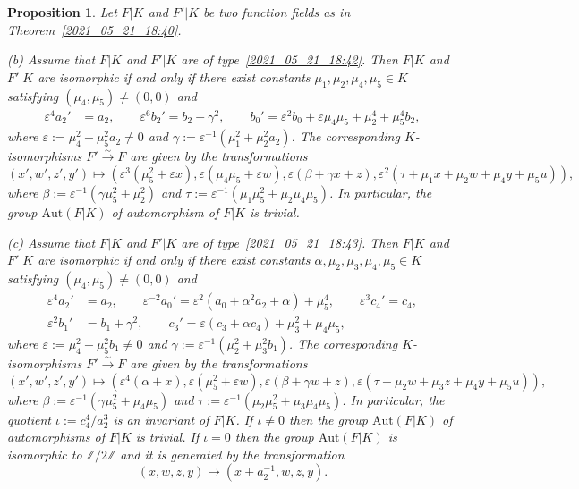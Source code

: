 \documentclass[12pt,reqno]{amsart}
\newtheorem{prop}[thm]{Proposition}
\theoremstyle{definition}
\newcommand{\Z}{\mathbb{Z}}
\newcommand{\al}{\alpha}
\newcommand{\be}{\beta}
\newcommand{\ga}{\gamma}
\newcommand{\eps}{\varepsilon}
\begin{document}
\begin{prop}\label{2024_05_10_01:40}
    Let $F|K$ and $F'|K$ be two function fields as in Theorem~\ref{2021_05_21_18:40}.
    
    \textnormal{(b)}
    Assume that $F|K$ and $F'|K$ are of type~\ref{2021_05_21_18:42}.
    Then $F|K$ and $F'|K$ are isomorphic if and only if there exist constants $\mu_1,\mu_2,\mu_4,\mu_5 \in K$ satisfying $(\mu_4,\mu_5) \neq (0,0)$ and
    \begin{align*}
        \eps^4 a_2' &= a_2, \qquad
        \eps^6 b_2' = b_2 + \ga^2, \qquad
        b_0' = \eps^2 b_0 + \eps \mu_4 \mu_5 + \mu_2^4 + \mu_5^4 b_2,
    \end{align*}
    where $\eps := \mu_4^2 + \mu_5^2 a_2 \neq 0$ and $\ga := \eps^{-1} (\mu_1^2 + \mu_2^2 a_2)$.    
    The corresponding $K$-isomorphisms $F'\overset\sim\to F$ are given by the transformations
    \[ (x',w',z',y') \mapsto ( \eps^3 (\mu_5^2 + \eps x), \eps(\mu_4 \mu_5 + \eps w), \eps (\be + \ga x + z), \eps^2 (\tau + \mu_1 x + \mu_2 w + \mu_4 y + \mu_5 u)), \]
    where $\be := \eps^{-1} (\ga \mu_5^2 + \mu_2^2)$ and $\tau := \eps^{-1} (\mu_1 \mu_5^2 + \mu_2 \mu_4 \mu_5)$.
    In particular, the group $\mathrm{Aut}(F|K)$ of automorphism of $F|K$ is trivial.
    
    \textnormal{(c)}
    Assume that $F|K$ and $F'|K$ are of type~\ref{2021_05_21_18:43}.
    Then $F|K$ and $F'|K$ are isomorphic if and only if there exist constants $\al,\mu_2,\mu_3,\mu_4,\mu_5 \in K$ satisfying $(\mu_4,\mu_5) \neq (0,0)$ and
    \begin{align*}
       \eps^4 a_2' &= a_2, \qquad
       \eps^{-2} a_0' = \eps^2 (a_0 + \al^2 a_2 + \al) + \mu_5^4, \qquad
       \eps^3 c_4' = c_4, \\
       \eps^2 b_1' &= b_1 + \ga^2, \qquad
       c_3' = \eps (c_3 + \al c_4) + \mu_3^2 + \mu_4 \mu_5,
    \end{align*}
    where $\eps := \mu_4^2 + \mu_5^2 b_1 \neq 0$ and
    $\ga := \eps^{-1} (\mu_2^2 + \mu_3^2 b_1)$.
    The corresponding $K$-isomorphisms $F'\overset\sim\to F$ are given by the transformations
    \[ (x',w',z',y') \mapsto ( \eps^4 (\al + x), \eps(\mu_5^2 + \eps w) ,\eps (\beta + \ga w + z), \eps (\tau + \mu_2 w + \mu_3 z + \mu_4 y + \mu_5 u)), \]
    where $\beta :=\eps^{-1} (\ga \mu_5^2 + \mu_4 \mu_5)$ and
    $\tau :=\eps^{-1} (\mu_2 \mu_5^2 + \mu_3 \mu_4 \mu_5)$.
    In particular, the quotient $\iota := c_4^4/a_2^3$ is an invariant of $F|K$.
    If $\iota\neq0$ then the group $\mathrm{Aut}(F|K)$ of automorphisms of $F|K$ is trivial. If $\iota=0$ then the group $\mathrm{Aut}(F|K)$ is isomorphic to $\Z/2\Z$ and it is generated by the transformation
    \[ (x,w,z,y) \mapsto (x + a_2^{-1}, w, z, y). \]
\end{prop}
\end{document}

